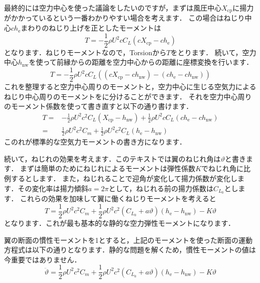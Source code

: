 \documentclass{jarticle}
\begin{document}
最終的には空力中心を使った議論をしたいのですが，まずは風圧中心$X_\mathrm{cp}$に揚力がかかっているという一番わかりやすい場合を考えます．
この場合はねじり中心$ch_\mathrm{e}$まわりのねじり上げを正としたモーメントは
\begin{equation}
    T = -\frac{1}{2}\rho U^2 c C_L (cX_\mathrm{cp} - ch_\mathrm{e})
\end{equation}
となります．ねじりモーメントなので，Torsionから$T$をとります．
続いて，空力中心$h_\mathrm{nw}$を使って前縁からの距離を空力中心からの距離に座標変換を行います．
\begin{equation}
    T = -\frac{1}{2}\rho U^2 c C_L ((cX_\mathrm{cp}-ch_\mathrm{nw}) - (ch_\mathrm{e}-ch_\mathrm{nw}))
\end{equation}
これを整理すると空力中心周りのモーメントと，空力中心に生じる空気力によるねじり中心周りのモーメントをに分けることができます．
それを空力中心周りのモーメント係数を使って書き直すと以下の通り書けます．
\begin{equation}
    \begin{split}
        T =& -\frac{1}{2}\rho U^2 c^2 C_L (X_\mathrm{cp}-h_\mathrm{nw}) + \frac{1}{2}\rho U^2 c C_L  (ch_\mathrm{e}-ch_\mathrm{nw}) \\
          =& \frac{1}{2}\rho U^2 c^2 C_m + \frac{1}{2}\rho U^2 c^2 C_L  (h_\mathrm{e}-h_\mathrm{nw})
    \end{split}
\end{equation}
このれが標準的な空気力モーメントの書き方になります．

続いて，ねじれの効果を考えます．このテキストでは翼のねじれ角は$\vartheta$と書きます．
まずは簡単のためにねじれによるモーメントは弾性係数$K$でねじれ角に比例するとします．
また，ねじれることで迎角が変化して揚力係数が変化します．その変化率は揚力傾斜$a=2\pi$として，ねじれる前の揚力係数は$C_{L_0}$とします．
これらの効果を加味して翼に働くねじりモーメントを考えると
\begin{equation}
    T = \frac{1}{2}\rho U^2 c^2 C_m + \frac{1}{2}\rho U^2 c^2 (C_{L_0} + a\vartheta)  (h_\mathrm{e}-h_\mathrm{nw}) - K \vartheta
\end{equation}
となります．これが最も基本的な静的な空力弾性モーメントになります．

翼の断面の慣性モーメントを1とすると，上記のモーメントを使った断面の運動方程式は以下の通りとなります．静的な問題を解くため，慣性モーメントの値は今重要ではありません．
\begin{equation}
    \ddot{\vartheta} = \frac{1}{2}\rho U^2 c^2 C_m + \frac{1}{2}\rho U^2 c^2 (C_{L_0} + a\vartheta)  (h_\mathrm{e}-h_\mathrm{nw}) - K \vartheta
\end{equation}
\end{document}
